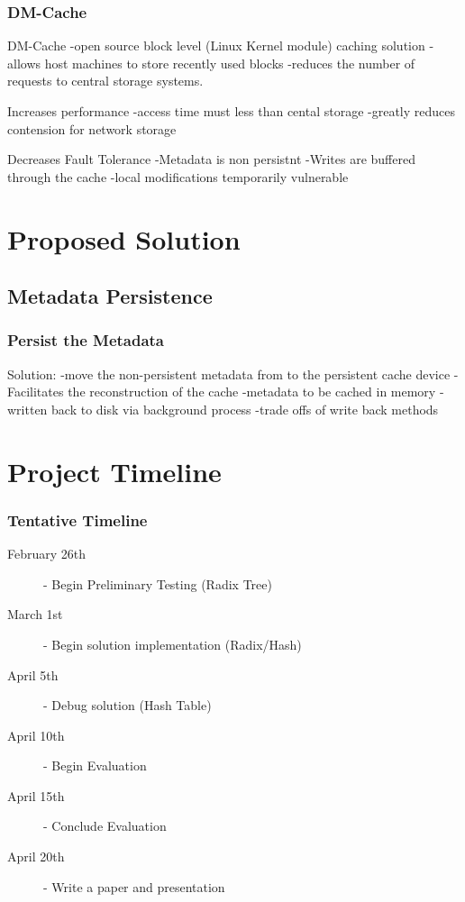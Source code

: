 \documentclass{beamer}
\begin{document}
\begin{frame}
  \frametitle{DM-Cache}

DM-Cache
-open source block level (Linux Kernel module) caching solution
-allows host machines to store recently used blocks
-reduces the number of requests to central storage systems.

Increases performance
-access time must less than cental storage
-greatly reduces contension for network storage

Decreases Fault Tolerance
-Metadata is non persistnt
-Writes are buffered through the cache
-local modifications temporarily vulnerable

\end{frame}



\section{Proposed Solution}

\subsection{Metadata Persistence}

\begin{frame}
  \frametitle{Persist the Metadata}

Solution:
-move the non-persistent metadata from to the persistent cache device
   -Facilitates the reconstruction of the cache
-metadata to be cached in memory
   -written back to disk via background process
	-trade offs of write back methods

\end{frame}



\section{Project Timeline}

\begin{frame}
  \frametitle{Tentative Timeline}
  \begin{description}
    \item[February 26th] - Begin Preliminary Testing (Radix Tree)
    \item[March 1st] - Begin solution implementation (Radix/Hash)
    \item[April 5th] - Debug solution (Hash Table)
    \item[April 10th] - Begin Evaluation
    \item[April 15th] - Conclude Evaluation
    \item[April 20th] - Write a paper and presentation
  \end{description}
\end{frame}
\end{document}
